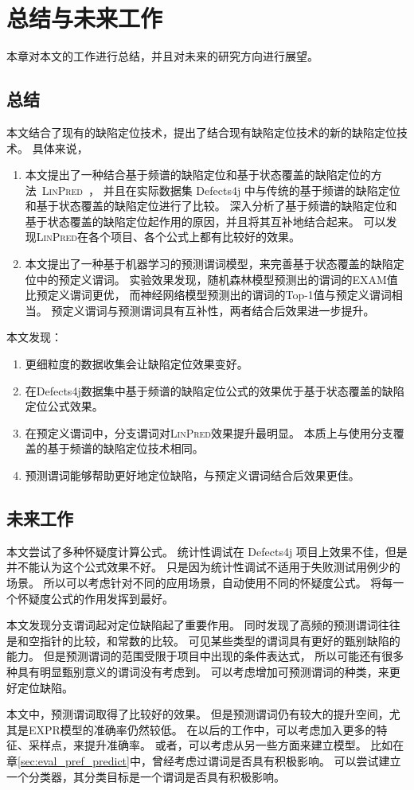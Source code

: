 \chapter{总结与未来工作}

本章对本文的工作进行总结，并且对未来的研究方向进行展望。

\section{总结}

本文结合了现有的缺陷定位技术，提出了结合现有缺陷定位技术的新的缺陷定位技术。
具体来说，
\begin{enumerate}
\item 本文提出了一种结合基于频谱的缺陷定位和基于状态覆盖的缺陷定位的方法~\textsc{LinPred}~，
并且在实际数据集 Defects4j 中与传统的基于频谱的缺陷定位和基于状态覆盖的缺陷定位进行了比较。
深入分析了基于频谱的缺陷定位和基于状态覆盖的缺陷定位起作用的原因，并且将其互补地结合起来。
可以发现\textsc{LinPred}在各个项目、各个公式上都有比较好的效果。
\item 本文提出了一种基于机器学习的预测谓词模型，来完善基于状态覆盖的缺陷定位中的预定义谓词。
实验效果发现，随机森林模型预测出的谓词的EXAM值比预定义谓词更优，
而神经网络模型预测出的谓词的Top-1值与预定义谓词相当。
预定义谓词与预测谓词具有互补性，两者结合后效果进一步提升。
\end{enumerate}

本文发现：
\begin{enumerate}
\item 更细粒度的数据收集会让缺陷定位效果变好。
\item 在Defects4j数据集中基于频谱的缺陷定位公式的效果优于基于状态覆盖的缺陷定位公式效果。
\item 在预定义谓词中，分支谓词对\textsc{LinPred}效果提升最明显。
本质上与使用分支覆盖的基于频谱的缺陷定位技术相同。
\item 预测谓词能够帮助更好地定位缺陷，与预定义谓词结合后效果更佳。
\end{enumerate}

\section{未来工作}

本文尝试了多种怀疑度计算公式。
统计性调试在 Defects4j 项目上效果不佳，但是并不能认为这个公式效果不好。
只是因为统计性调试不适用于失败测试用例少的场景。
所以可以考虑针对不同的应用场景，自动使用不同的怀疑度公式。
将每一个怀疑度公式的作用发挥到最好。

本文发现分支谓词起对定位缺陷起了重要作用。
同时发现了高频的预测谓词往往是和空指针的比较，和常数的比较。
可见某些类型的谓词具有更好的甄别缺陷的能力。
但是预测谓词的范围受限于项目中出现的条件表达式，
所以可能还有很多种具有明显甄别意义的谓词没有考虑到。
可以考虑增加可预测谓词的种类，来更好定位缺陷。

本文中，预测谓词取得了比较好的效果。
但是预测谓词仍有较大的提升空间，尤其是EXPR模型的准确率仍然较低。
在以后的工作中，可以考虑加入更多的特征、采样点，来提升准确率。
或者，可以考虑从另一些方面来建立模型。
比如在章\ref{sec:eval_pref_predict}中，曾经考虑过谓词是否具有积极影响。
可以尝试建立一个分类器，其分类目标是一个谓词是否具有积极影响。
